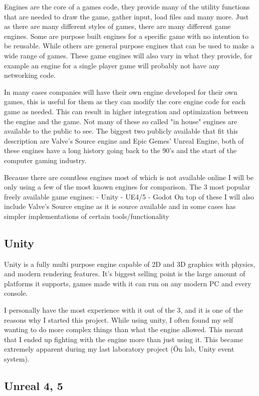 Engines are the core of a games code, they provide many of the utility functions that are needed to draw the game, gather input, load files and many more. Just as there are many different styles of games, there are many different game engines. Some are purpose built engines for a specific game with no intention to be reusable. While others are general purpose engines that can be used to make a wide range of games. These game engines will also vary in what they provide, for example an engine for a single player game will probably not have any networking code.

In many cases companies will have their own engine developed for their own games, this is useful for them as they can modify the core engine code for each game as needed. This can result in higher integration and optimization between the engine and the game. Not many of these so called "in house" engines are available to the public to see. The biggest two publicly available that fit this description are Valve's Source engine and Epic Gemes' Unreal Engine, both of these engines have a long history going back to the 90's and the start of the computer gaming industry.

Because there are countless engines most of which is not available online I will be only using a few of the most known engines for comparison.
The 3 most popular freely available game engines:
- Unity
- UE4/5
- Godot
On top of these I will also include Valve's Source engine as it is source available and in some cases has simpler implementations of certain tools/functionality

\subsection{Unity}

Unity is a fully multi purpose engine capable of 2D and 3D graphics with physics, and modern rendering features. It's biggest selling point is the large amount of platforms it supports, games made with it can run on any modern PC and every console.

I personally have the most experience with it out of the 3, and it is one of the reasons why I started this project. While using unity, I often found my self wanting to do more complex things than what the engine allowed. This meant that I ended up fighting with the engine more than just using it. This became extremely apparent during my last laboratory project (Ön lab, Unity event system).

\subsection{Unreal 4, 5}

